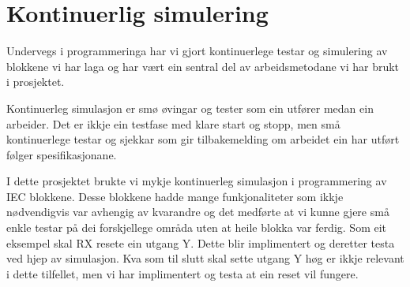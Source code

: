 \section{Kontinuerlig simulering}
\thispagestyle{fancy}

Undervegs i programmeringa har vi gjort kontinuerlege testar og simulering av blokkene vi har laga og
har vært ein sentral del av arbeidsmetodane vi har brukt i prosjektet. 

Kontinuerleg simulasjon er smø øvingar og tester som ein utfører medan ein arbeider.
Det er ikkje ein testfase med klare start og stopp, men små kontinuerlege testar og sjekkar som gir tilbakemelding
om arbeidet ein har utført følger spesifikasjonane.

I dette prosjektet brukte vi mykje kontinuerleg simulasjon i programmering av IEC blokkene.
Desse blokkene hadde mange funkjonaliteter som ikkje nødvendigvis var avhengig av kvarandre og
det medførte at vi kunne gjere små enkle testar på dei forskjellege områda uten at heile blokka var ferdig. \newline
Som eit eksempel skal RX resete ein utgang Y. Dette blir implimentert og deretter testa ved hjep av simulasjon.
Kva som til slutt skal sette utgang Y høg er ikkje relevant i dette tilfellet, men vi har implimentert 
og testa at ein reset vil fungere.

\newpage